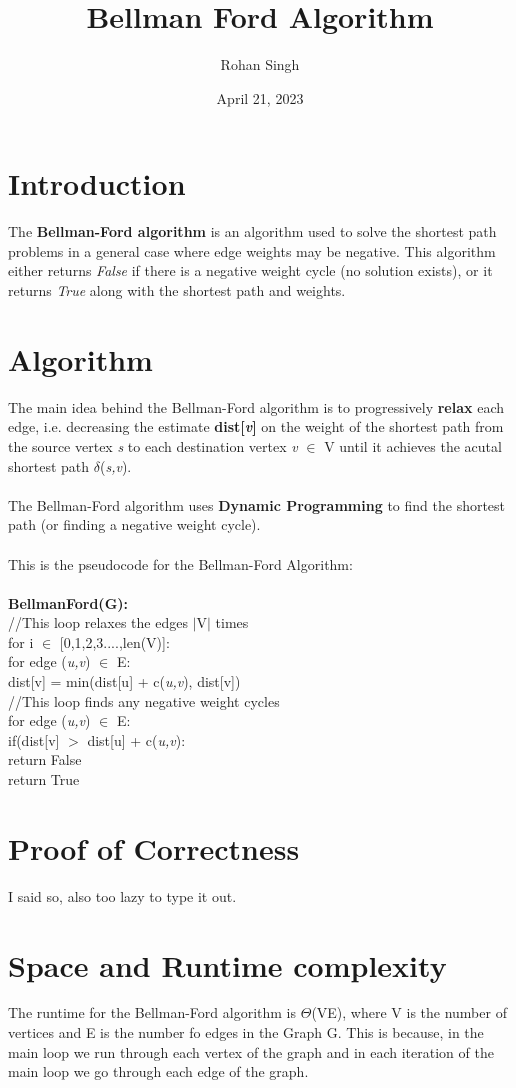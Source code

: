 \documentclass[12pt, letterpaper]{article}
\title{Bellman Ford Algorithm}
\author{Rohan Singh}
\date{April 21, 2023}
\newcommand\tab[1][1cm]{\hspace*{#1}}
\begin{document}
\maketitle

\section{Introduction}
The \textbf{Bellman-Ford algorithm} is an algorithm used to solve the shortest path problems in a general case where edge weights may be negative. This algorithm either returns \textit{False} if there is a negative weight cycle (no solution exists), or it returns \textit{True} along with the shortest path and weights.

\section{Algorithm}
The main idea behind the Bellman-Ford algorithm is to progressively \textbf{relax} each edge, i.e. decreasing the estimate \textbf{dist[\textit{v}]} on the weight of the shortest path from the source vertex \textit{s} to each destination vertex \textit{v} $\in$ V until it achieves the acutal shortest path $\delta$(\textit{s,v}). \\\\
The Bellman-Ford algorithm uses \textbf{Dynamic Programming} to find the shortest path (or finding a negative weight cycle). \\\\
This is the pseudocode for the Bellman-Ford Algorithm:\\\\
\textbf{BellmanFord(G):}\\
//This loop relaxes the edges $|$V$|$ times\\
for i $\in$ [0,1,2,3....,len(V)]:\\
\tab for edge (\textit{u,v}) $\in$ E:\\
\tab \tab dist[v] = min(dist[u] + c(\textit{u,v}), dist[v])\\
//This loop finds any negative weight cycles\\
for edge (\textit{u,v}) $\in$ E:\\
\tab if(dist[v] $>$ dist[u] + c(\textit{u,v}):\\
\tab \tab return False\\
return True

\section{Proof of Correctness}
I said so, also too lazy to type it out.

\section{Space and Runtime complexity}
The runtime for the Bellman-Ford algorithm is $\Theta$(VE), where V is the number of vertices and E is the number fo edges in the Graph G. This is because, in the main loop we run through each vertex of the graph and in each iteration of the main loop we go through each edge of the graph.\\\\
\end{document}
